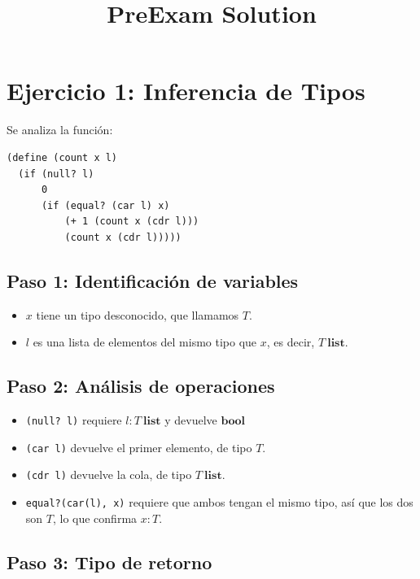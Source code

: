 \documentclass[11pt]{article}
\title{PreExam Solution}
\author{}
\date{}
\begin{document}
\maketitle


\section{Ejercicio 1: Inferencia de Tipos}


Se analiza la función:

\begin{verbatim}
(define (count x l)
  (if (null? l)
      0
      (if (equal? (car l) x)
          (+ 1 (count x (cdr l)))
          (count x (cdr l)))))
\end{verbatim}

\subsection*{Paso 1: Identificación de variables}

\begin{itemize}
    \item $x$ tiene un tipo desconocido, que llamamos $T$.
    \item $l$ es una lista de elementos del mismo tipo que $x$, es decir,
          $T\ \mathbf{list}$.
\end{itemize}

\subsection*{Paso 2: Análisis de operaciones}

\begin{itemize}
    \item \texttt{(null? l)} requiere $l : T\ \mathbf{list}$ y devuelve
          $\mathbf{bool}$
    \item \texttt{(car l)} devuelve el primer elemento, de tipo $T$.
    \item \texttt{(cdr l)} devuelve la cola, de tipo $T\ \mathbf{list}$.
    \item \texttt{equal?(car(l), x)} requiere que ambos tengan el mismo tipo,
          así que los dos son $T$, lo que confirma $x : T$.
\end{itemize}

\subsection*{Paso 3: Tipo de retorno}
\end{document}
